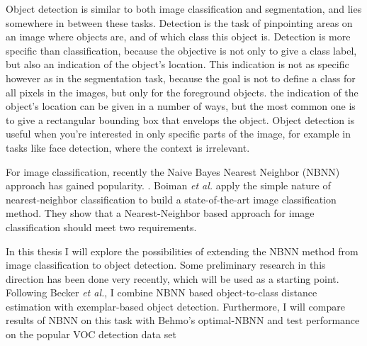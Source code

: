 \documentclass[a4paper,10pt]{article}
\begin{document}
Object detection is similar to both image classification and segmentation, and lies somewhere in between these tasks. Detection is the task of pinpointing areas on an image where objects are, and of which class this object is. Detection is more specific than classification, because the objective is not only to give a class label, but also an indication of the object's location. This indication is not as specific however as in the segmentation task, because the goal is not to define a class for all pixels in the images, but only for the foreground objects. the indication of the object's location can be given in a number of ways, but the most common one is to give a rectangular bounding box that envelops the object. Object detection is useful when you're interested in only specific parts of the image, for example in tasks like face detection, where the context is irrelevant. 


For image classification, recently the Naive Bayes Nearest Neighbor (NBNN) \cite{boiman2008defense} approach has gained popularity. . Boiman \emph{et al.} apply the simple nature of nearest-neighbor classification to build a state-of-the-art image classification method. They show that a Nearest-Neighbor based approach for image classification should meet two requirements. 

In this thesis I will explore the possibilities of extending the NBNN method from image classification to object detection. Some preliminary research in this direction has been done very recently\cite{becker2012codebook}, which will be used as a starting point. Following Becker \emph{et al.}\cite{becker2012codebook}, I combine NBNN based object-to-class distance estimation with exemplar-based object detection\cite{chum2007exemplar}. Furthermore, I will compare results of NBNN on this task with Behmo's optimal-NBNN\cite{behmo2010towards} and test performance on the popular VOC detection data set 
\end{document}
